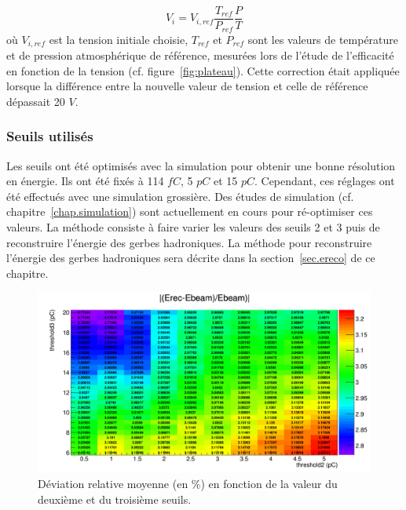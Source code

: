 \begin{equation}
  V_{i}=V_{i,ref}\frac{T_{ref}}{P_{ref}}\frac{P}{T}
\end{equation}
où $V_{i,ref}$ est la tension initiale choisie, $T_{ref}$ et $P_{ref}$ sont les valeurs de température et de pression atmosphérique de référence, mesurées lors de l'étude de l'efficacité en fonction de la tension (cf. figure~\ref{fig:plateau}). Cette correction était appliquée lorsque la différence entre la nouvelle valeur de tension et celle de référence dépassait 20 $V$. 
\subsubsection{Seuils utilisés}
Les seuils ont été optimisés avec la simulation pour obtenir une bonne résolution en énergie. Ils ont été fixés à 114 $fC$, 5 $pC$ et 15 $pC$. Cependant, ces réglages ont été effectués avec une simulation grossière. Des études de simulation (cf. chapitre~\ref{chap.simulation}) sont actuellement en cours pour ré-optimiser ces valeurs. La méthode consiste à faire varier les valeurs des seuils 2 et 3 puis de reconstruire l'énergie des gerbes hadroniques. La méthode pour reconstruire l'énergie des gerbes hadroniques sera décrite dans la section~\ref{sec.ereco} de ce chapitre.
\begin{figure}[!ht]
  \begin{center}
    \includegraphics[width=1.\textwidth]{SDHCAL/figs/cumulLinear.png}
    \caption{Déviation relative moyenne (en $\%$) en fonction de la valeur du deuxième et du troisième seuils.}
    \label{fig:lin_vs_thr}
  \end{center}
\end{figure}
